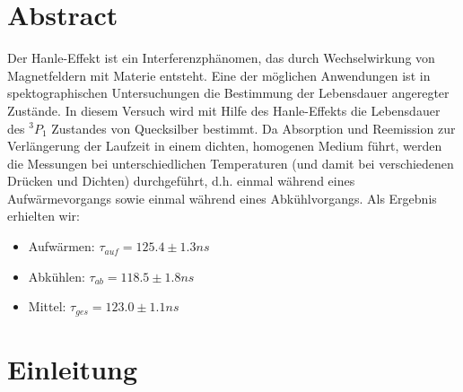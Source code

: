 \documentclass[12pt]{article}
\title{\vspace{0cm}{\Huge Fortgeschrittenen-Praktikum I:\\ \vspace{1cm} Der Hanle-Effekt}}
\author{Saskia Bondza\\Simon Stephan}
\date{durchgeführt am 28. und 29.09.2016}
\begin{document}
\maketitle
\newpage

\section*{Abstract}

Der Hanle-Effekt ist ein Interferenzphänomen, das durch Wechselwirkung von Magnetfeldern mit Materie entsteht. Eine der möglichen Anwendungen ist in spektographischen Untersuchungen die Bestimmung der Lebensdauer angeregter Zustände. In diesem Versuch wird mit Hilfe des Hanle-Effekts die Lebensdauer des $^3P_1$ Zustandes von Quecksilber bestimmt. Da Absorption und Reemission zur Verlängerung der Laufzeit in einem dichten, homogenen Medium führt, werden die Messungen bei unterschiedlichen Temperaturen (und damit bei verschiedenen Drücken und Dichten) durchgeführt, d.h. einmal während eines Aufwärmevorgangs sowie einmal während eines Abkühlvorgangs. Als Ergebnis erhielten wir:
\begin{itemize}
	\item Aufwärmen: $\tau_{auf} = 125.4 \pm 1.3 ns$
	\item Abkühlen: $\tau_{ab} = 118.5 \pm 1.8 ns$
	\item Mittel: $\tau_{ges} = 123.0 \pm 1.1 ns$
\end{itemize}

\newpage

\thispagestyle{empty}
\tableofcontents
\newpage

\section{Einleitung}
\end{document}
